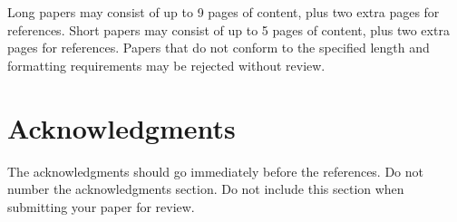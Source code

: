 \documentclass[11pt]{article}
\begin{document}
Long papers may consist of up to 9 pages of content, plus two extra
pages for references. Short papers may consist of up to 5 pages of
content, plus two extra pages for references.  Papers that do not
conform to the specified length and formatting requirements may be
rejected without review.

\section*{Acknowledgments}

The acknowledgments should go immediately before the references.  Do
not number the acknowledgments section. Do not include this section
when submitting your paper for review.

\printbibliography 
\end{document}
